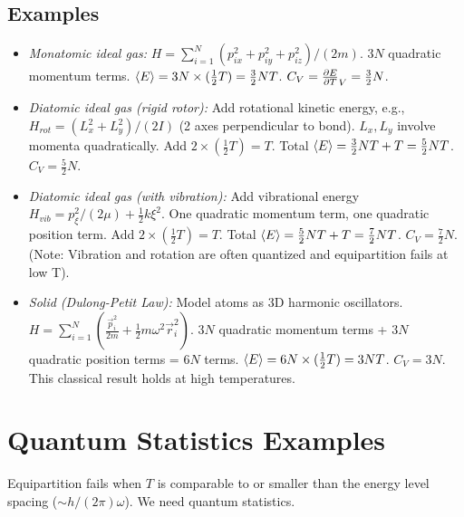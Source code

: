 \documentclass[10pt, letterpaper]{article}
\renewcommand{\hbar}{h/(2\pi)} %
\newcommand{\avg}[1]{\expval{#1}} %
\begin{document}
\subsection{Examples}
\begin{itemize}
    \item \textit{Monatomic ideal gas:} $H = \sum_{i=1}^N (p_{ix}^2 + p_{iy}^2 + p_{iz}^2)/(2m)$. $3N$ quadratic momentum terms. $\avg{E} = 3N \times (\frac{1}{2}T) = \frac{3}{2}NT$. $C_V = \pdv{E}{T}_V = \frac{3}{2}N$.
    \item \textit{Diatomic ideal gas (rigid rotor):} Add rotational kinetic energy, e.g., $H_{rot} = (L_x^2 + L_y^2)/(2I)$ (2 axes perpendicular to bond). $L_x, L_y$ involve momenta quadratically. Add $2 \times (\frac{1}{2}T) = T$. Total $\avg{E} = \frac{3}{2}NT + T = \frac{5}{2}NT$. $C_V = \frac{5}{2}N$.
    \item \textit{Diatomic ideal gas (with vibration):} Add vibrational energy $H_{vib} = p_{\xi}^2/(2\mu) + \frac{1}{2}k\xi^2$. One quadratic momentum term, one quadratic position term. Add $2 \times (\frac{1}{2}T) = T$. Total $\avg{E} = \frac{5}{2}NT + T = \frac{7}{2}NT$. $C_V = \frac{7}{2}N$. (Note: Vibration and rotation are often quantized and equipartition fails at low T).
    \item \textit{Solid (Dulong-Petit Law):} Model atoms as 3D harmonic oscillators. $H = \sum_{i=1}^{N} (\frac{\vec{p}_i^2}{2m} + \frac{1}{2}m\omega^2 \vec{r}_i^2)$. $3N$ quadratic momentum terms + $3N$ quadratic position terms = $6N$ terms. $\avg{E} = 6N \times (\frac{1}{2}T) = 3NT$. $C_V = 3N$. This classical result holds at high temperatures.
\end{itemize}

\section{Quantum Statistics Examples}
Equipartition fails when $T$ is comparable to or smaller than the energy level spacing ($\sim \hbar \omega$). We need quantum statistics.
\end{document}
